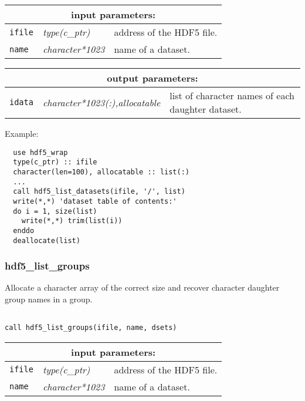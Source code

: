 \noindent
\begin{tabular}{|p{1.5cm}|p{3cm}|p{10cm}|}
\hline
\multicolumn{3}{|c|}{\bf input parameters:} \\
\hline
{\tt ifile} & {\it type(c\_ptr)} & address of the HDF5 file. \\
\hline
{\tt name} & {\it character*1023} & name of a dataset. \\
\hline
\end{tabular}

\vskip 0.8cm

\noindent
\begin{tabular}{|p{1.5cm}|p{4.5cm}|p{8.5cm}|}
\hline
\multicolumn{3}{|c|}{\bf output parameters:} \\
\hline
{\tt idata} & {\it character*1023(:),allocatable} & list of character names of each daughter dataset.\\
\hline
\end{tabular}

\vskip 0.5cm

\noindent Example:
\begin{verbatim}
  use hdf5_wrap
  type(c_ptr) :: ifile
  character(len=100), allocatable :: list(:)
  ...
  call hdf5_list_datasets(ifile, '/', list)
  write(*,*) 'dataset table of contents:'
  do i = 1, size(list)
    write(*,*) trim(list(i))
  enddo
  deallocate(list)
\end{verbatim}

\subsubsection{hdf5\_list\_groups}

Allocate a character array of the correct size and recover character daughter group names in a group.

\begin{verbatim}

call hdf5_list_groups(ifile, name, dsets)
\end{verbatim}

\noindent
\begin{tabular}{|p{1.5cm}|p{3cm}|p{10cm}|}
\hline
\multicolumn{3}{|c|}{\bf input parameters:} \\
\hline
{\tt ifile} & {\it type(c\_ptr)} & address of the HDF5 file. \\
\hline
{\tt name} & {\it character*1023} & name of a dataset. \\
\hline
\end{tabular}

